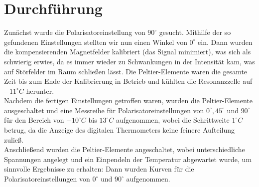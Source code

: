 \section{Durchführung}
Zunächst wurde die Polarisatoreinstellung von $90^{\circ}$ gesucht. Mithilfe der so gefundenen Einstellungen stellten wir nun einen Winkel von $0^{\circ}$ ein. Dann wurden die kompensierenden Magnetfelder kalibriert (das Signal minimiert), was sich als schwierig erwies, da es immer wieder zu Schwankungen in der Intensität kam, was auf Störfelder im Raum schließen lässt. Die Peltier-Elemente waren die gesamte Zeit bis zum Ende der Kalibrierung in Betrieb und kühlten die Resonanzzelle auf $-11^{\circ}C$ herunter. \\
Nachdem die fertigen Einstellungen getroffen waren, wurden die Peltier-Elemente ausgeschaltet und eine Messreihe für Polarisatoreinstellungen von $0^{\circ}, 45^{\circ}$ und $90^{\circ}$ für den Bereich von $-10^{\circ}C$ bis $13^{\circ}C$ aufgenommen, wobei die Schrittweite $1^{\circ}C$ betrug, da die Anzeige des digitalen Thermometers keine feinere Aufteilung zuließ. \\
Anschließend wurden die Peltier-Elemente angeschaltet, wobei unterschiedliche Spannungen angelegt und ein Einpendeln der Temperatur abgewartet wurde, um sinnvolle Ergebnisse zu erhalten: Dann wurden Kurven für die Polarisatoreinstellungen von $0^{\circ}$ und $90^{\circ}$ aufgenommen.